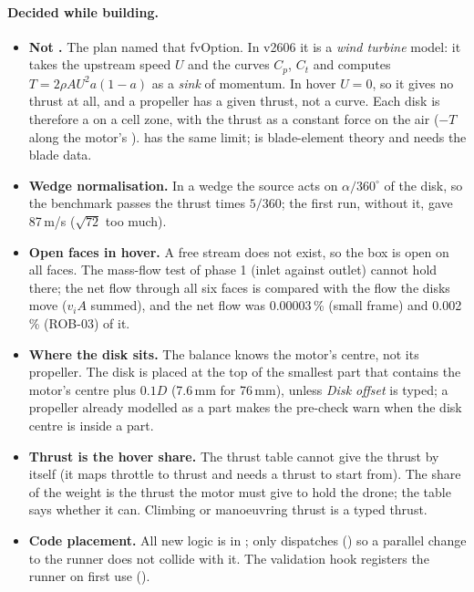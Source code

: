 \paragraph{Decided while building.}
\begin{itemize}[nosep]
  \item \textbf{Not .} The plan named that fvOption. In v2606 it is a \emph{wind turbine}
        model: it takes the upstream speed $U$ and the curves $C_p$, $C_t$ and computes $T=2\rho A U^2a(1-a)$ as a
        \emph{sink} of momentum. In hover $U=0$, so it gives no thrust at all, and a propeller has a given thrust,
        not a curve. Each disk is therefore a  on a cell zone, with the thrust as a
        constant force on the air ($-T$ along the motor's ).  has the
        same limit;  is blade-element theory and needs the blade data.
  \item \textbf{Wedge normalisation.} In a wedge the source acts on $\alpha/360^\circ$ of the disk, so the benchmark
        passes the thrust times $5/360$; the first run, without it, gave 87\,m/s ($\sqrt{72}$ too much).
  \item \textbf{Open faces in hover.} A free stream does not exist, so the box is open on all faces. The mass-flow
        test of phase 1 (inlet against outlet) cannot hold there; the net flow through all six faces is compared
        with the flow the disks move ($v_iA$ summed), and the net flow was 0.00003\,\% (small frame) and 0.002\,\% (ROB-03) of it.
  \item \textbf{Where the disk sits.} The balance knows the motor's centre, not its propeller. The disk is placed at
        the top of the smallest part that contains the motor's centre plus $0.1D$ (7.6\,mm for 76\,mm), unless
        \emph{Disk offset} is typed; a propeller already modelled as a part makes the pre-check warn when the disk
        centre is inside a part.
  \item \textbf{Thrust is the hover share.} The thrust table cannot give the thrust by itself (it maps throttle to
        thrust and needs a thrust to start from). The share of the weight is the thrust the motor must give to hold the
        drone; the table says whether it can. Climbing or manoeuvring thrust is a typed thrust.
  \item \textbf{Code placement.} All new logic is in ;  only
        dispatches () so a parallel change to the runner does not collide with it. The validation
        hook registers the  runner on first use ().
\end{itemize}

